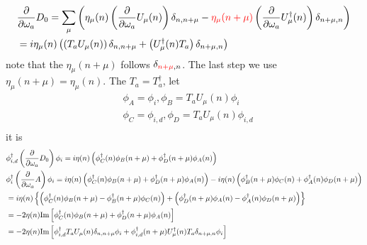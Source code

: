 \begin{equation}
\begin{split}
&\frac{\partial }{\partial \omega _a}  D_{0}=\sum _{\mu}\left(\eta _{\mu}(n)\left(\frac{\partial }{\partial \omega _a}U_{\mu}(n)\right) \delta _{n,n+\mu} - \textcolor[rgb]{1,0,0}{\eta _{\mu}(n+\mu)}\left(\frac{\partial }{\partial \omega _a} U^{\dagger}_{\mu}(n)\right)\delta _{n+\mu,n}\right)\\
&=i\eta _{\mu}(n)\left(\left(T_aU_{\mu}(n)\right) \delta _{n,n+\mu} + \left(U^{\dagger}_{\mu}(n)T_a\right)\delta _{n+\mu,n}\right)\\
\end{split}
\end{equation}
note that the $\eta _{\mu} (n+\mu)$ follows $\delta _{\textcolor[rgb]{1,0,0}{n+\mu},n}$. The last step we use $\eta _{\mu}(n+\mu)=\eta_{\mu}(n)$.
The $T_a=T_a^{\dagger}$, let
\begin{equation}
\begin{split}
&\phi _A = \phi _i, \phi _B = T_aU_{\mu}(n)\phi _i\\
&\phi _C = \phi _{i,d}, \phi _D = T_aU_{\mu}(n)\phi _{i,d}\\
\end{split}
\end{equation}
it is
\begin{equation}
\begin{split}
&\phi _{i,d}^{\dagger}\left(\frac{\partial }{\partial \omega _a}D_{0}\right)\phi _i = i\eta(n)\left(\phi _C^{\dagger}(n)\phi _B(n+\mu) + \phi _D^{\dagger}(n+\mu) \phi _A(n)\right)\\
&\phi _i^{\dagger}\left(\frac{\partial }{\partial \omega _a}A\right)\phi _i=i\eta(n)\left(\phi _C^{\dagger}(n)\phi _B(n+\mu) + \phi _D^{\dagger}(n+\mu)\phi _A(n)\right)-i\eta(n)\left(\phi _B^{\dagger}(n+\mu)\phi _C(n) + \phi _A^{\dagger}(n)\phi _D(n+\mu)\right)\\
&=i\eta (n)\left\{\left(\phi _C^{\dagger}(n)\phi _B(n+\mu)-\phi _B^{\dagger}(n+\mu)\phi _C(n)\right)+\left( \phi _D^{\dagger}(n+\mu)\phi _A(n)-\phi _A^{\dagger}(n)\phi _D(n+\mu)\right)\right\}\\
&=-2\eta (n) {\rm Im}\left[\phi _C^{\dagger}(n)\phi _B(n+\mu) + \phi _D^{\dagger}(n+\mu)\phi _A(n)\right]\\
&=-2\eta (n) {\rm Im}\left[\phi _{i,d}^{\dagger}T_aU_{\mu}(n) \delta _{n,n+\mu}\phi _i + \phi _{i,d}^{\dagger}(n+\mu)U^{\dagger}_{\mu}(n)T_a\delta _{n+\mu,n}\phi _i\right]\\
\end{split}
\end{equation}
